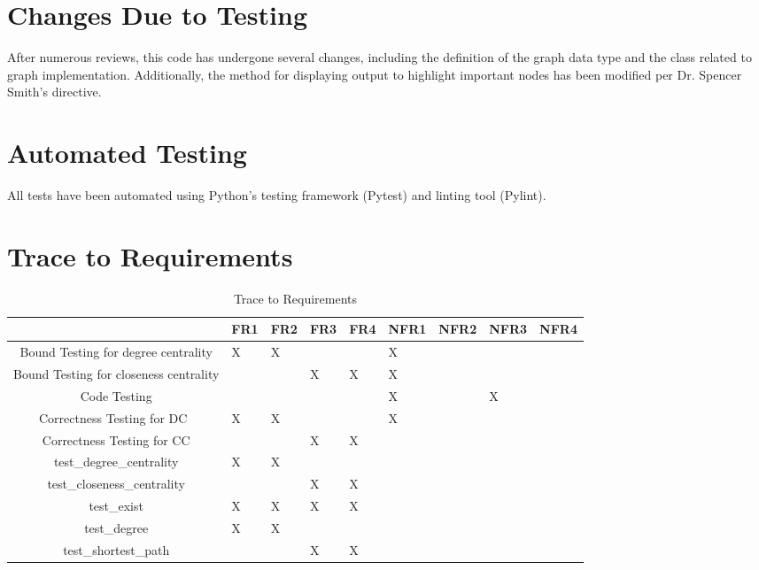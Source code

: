 \documentclass[12pt, titlepage]{article}
\begin{document}
\section{Changes Due to Testing}
After numerous reviews, this code has undergone several changes, including the definition of the graph data type and the class related to graph implementation. Additionally, the method for displaying output to highlight important nodes has been modified per Dr. Spencer Smith's directive.


\section{Automated Testing}

All tests have been automated using Python's testing framework (Pytest) and linting tool (Pylint).		
\section{Trace to Requirements}
\begin{table}[h!]
\centering
\begin{tabular}{|c|p{0.5cm}|p{0.5cm}|p{0.5cm}|p{0.5cm}|p{1cm}|p{1cm}|p{1cm}|p{1cm}|}
\hline
	&FR1 &FR2 & FR3 & FR4 &NFR1 &NFR2 & NFR3 & NFR4\\
\hline
 Bound Testing for degree centrality     & X& X&  &  & X & & & \\ \hline
Bound Testing for closeness centrality    & &   &  X&X  & X & & & \\ \hline
Code Testing    &   &   &  &  & X & & X& \\ \hline
Correctness Testing for DC\    &X  &X   &  &  & X & & & \\ \hline
Correctness Testing for CC    &  &  & X & X &  & & & \\ \hline
test\_degree\_centrality    & X & X &  &  &  & & & \\ \hline
 test\_closeness\_centrality    &  &  & X & X &  & & & \\ \hline
test\_exist    & X &X  & X & X &  & & & \\ \hline
test\_degree    & X &X  &  &  &  & & & \\ \hline
test\_shortest\_path    &  &  & X & X &  & & & \\ \hline
\end{tabular}
\caption{Trace to Requirements}
\label{Table:A_trace}
\end{table}		
\end{document}
